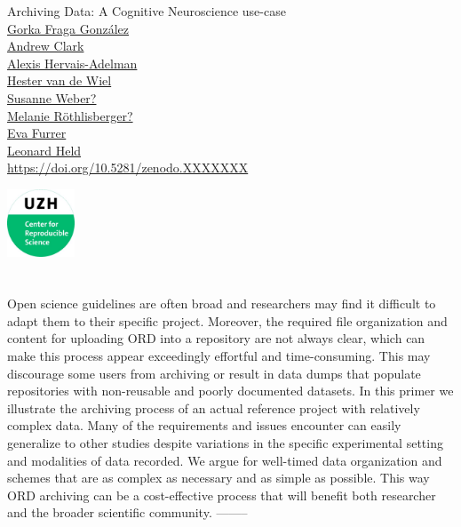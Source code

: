 \documentclass[a4paper,11pt]{report}\usepackage[]{graphicx}\usepackage[dvipsnames]{xcolor}
\renewcommand\url[1]{{\href{#1}{#1}}}
\begin{document}
\begin{minipage}{\textwidth}
    {\Huge \textcolor{swissRNblue}{Archiving Data: A Cognitive Neuroscience use-case}} \\[0.5ex]
    \href{https://orcid.org/0000-0002-1857-8607}{Gorka Fraga González}\\
    \href{https://orcid.org/xxxx}{Andrew Clark}\\
    \href{https://orcid.org/xxxx}{Alexis Hervais-Adelman }\\        
    \href{https://orcid.org/xxxx}{Hester van de Wiel}\\    
    \href{https://orcid.org/xxxx}{Susanne Weber?}\\
    \href{https://orcid.org/xxxx}{Melanie Röthlisberger?}\\    
    \href{https://orcid.org/xxxx}{Eva Furrer}\\    
    \href{https://orcid.org/xxxx}{Leonard Held}\\
    \url{https://doi.org/10.5281/zenodo.XXXXXXX}
\end{minipage}%
\begin{minipage}{0.02\textwidth}
    \centering
    \includegraphics[height=2cm]{CRS.jpg}
\end{minipage}%





\section*{}

Open science guidelines are often broad and researchers may find it difficult to adapt them to their specific project. Moreover, the required file organization and content for uploading ORD into a repository are not always clear, which can make this process appear exceedingly effortful and time-consuming. This may discourage some users from archiving or result in data dumps that populate repositories with non-reusable and poorly documented datasets. In this primer we illustrate the archiving process of an actual reference project with relatively complex data. Many of the requirements and issues encounter can easily generalize to other studies despite variations in the specific experimental setting and modalities of data recorded. We argue for well-timed data organization and schemes that are as complex as necessary and as simple as possible. This way ORD archiving can be a cost-effective process that will benefit both researcher and the broader scientific community. 
-------- 
\end{document}
